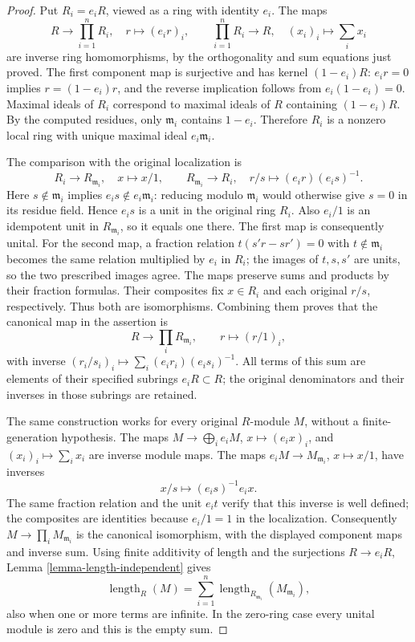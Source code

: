 \begin{proof}
Put $R_i=e_iR$, viewed as a ring with identity $e_i$.
The maps
$$
R\longrightarrow\prod_{i=1}^n R_i,\quad r\longmapsto(e_ir)_i,
\qquad
\prod_{i=1}^n R_i\longrightarrow R,\quad (x_i)_i\longmapsto\sum_i x_i
$$
are inverse ring homomorphisms, by the orthogonality and sum
equations just proved. The first component map is surjective
and has kernel $(1-e_i)R$: $e_ir=0$ implies
$r=(1-e_i)r$, and the reverse implication follows from
$e_i(1-e_i)=0$.
Maximal ideals of $R_i$ correspond to maximal ideals of $R$
containing $(1-e_i)R$. By the computed residues, only
$\mathfrak m_i$ contains $1-e_i$.
Therefore $R_i$ is a nonzero local ring with unique maximal
ideal $e_i\mathfrak m_i$.

The comparison with the original localization is
$$
R_i\longrightarrow R_{\mathfrak m_i},\quad x\longmapsto x/1,
\qquad
R_{\mathfrak m_i}\longrightarrow R_i,\quad
r/s\longmapsto (e_ir)(e_is)^{-1}.
$$
Here $s\notin\mathfrak m_i$ implies
$e_is\notin e_i\mathfrak m_i$: reducing modulo
$\mathfrak m_i$ would otherwise give $s=0$ in its residue
field. Hence $e_is$ is a unit in the original ring $R_i$.
Also $e_i/1$ is an idempotent unit in $R_{\mathfrak m_i}$,
so it equals one there. The first map is consequently unital.
For the second map, a fraction relation
$t(s'r-sr')=0$ with $t\notin\mathfrak m_i$ becomes the
same relation multiplied by $e_i$ in $R_i$; the images of
$t,s,s'$ are units, so the two prescribed images agree.
The maps preserve sums and products by their fraction formulas.
Their composites fix $x\in R_i$ and each original $r/s$,
respectively. Thus both are isomorphisms.
Combining them proves that the canonical map in the assertion is
$$
R\longrightarrow\prod_i R_{\mathfrak m_i},\qquad r\longmapsto(r/1)_i,
$$
with inverse
$(r_i/s_i)_i\mapsto\sum_i(e_ir_i)(e_is_i)^{-1}$.
All terms of this sum are elements of their specified subrings
$e_iR\subset R$; the original denominators and their inverses
in those subrings are retained.

The same construction works for every original $R$-module $M$,
without a finite-generation hypothesis. The maps
$M\to\bigoplus_i e_iM$, $x\mapsto(e_ix)_i$, and
$(x_i)_i\mapsto\sum_i x_i$ are inverse module maps.
The maps $e_iM\to M_{\mathfrak m_i}$, $x\mapsto x/1$,
have inverses
$$
x/s\longmapsto(e_is)^{-1}e_ix.
$$
The same fraction relation and the unit $e_it$ verify that this
inverse is well defined; the composites are identities because
$e_i/1=1$ in the localization.
Consequently $M\to\prod_i M_{\mathfrak m_i}$ is the canonical
isomorphism, with the displayed component maps and inverse sum.
Using finite additivity of length and the surjections
$R\to e_iR$, Lemma \ref{lemma-length-independent} gives
$$
\operatorname{length}_R(M)
=\sum_{i=1}^n\operatorname{length}_{R_{\mathfrak m_i}}
 (M_{\mathfrak m_i}),
$$
also when one or more terms are infinite. In the zero-ring case
every unital module is zero and this is the empty sum.
\end{proof}